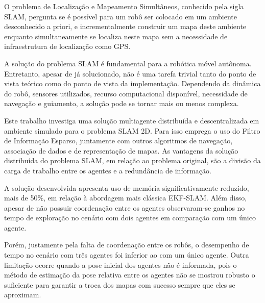 O problema de Localização e Mapeamento Simultâneos, conhecido pela sigla SLAM, pergunta se é possível para um robô ser colocado em um ambiente 
desconhecido a priori, e incrementalmente construir um mapa deste 
ambiente enquanto simultaneamente se localiza neste mapa sem a 
necessidade de infraestrutura de localização como GPS.

A solução do problema SLAM é fundamental para a robótica móvel 
autônoma. Entretanto, apesar de já solucionado, não é uma tarefa trivial 
tanto do ponto de vista teórico como do ponto de vista da implementação. 
Dependendo da dinâmica do robô, sensores utilizados, recurso 
computacional disponível, necessidade de navegação e guiamento, a solução 
pode se tornar mais ou menos complexa.

Este trabalho investiga uma solução multiagente distribuída e descentralizada em ambiente simulado 
para o problema SLAM 2D. Para isso emprega o uso do Filtro de Informação 
Esparso, juntamente com outros algoritmos de navegação, associação de 
dados e de representação de mapas. As vantagens da solução distribuída do 
problema SLAM, em relação ao problema original, são a divisão da carga 
de trabalho entre os agentes e a redundância de informação.

A solução desenvolvida apresenta uso de memória significativamente 
reduzido, mais de 50\%, em relação à abordagem mais clássica EKF-SLAM. 
Além disso, apesar de não possuir coordenação entre os agentes 
observaram-se ganhos no tempo de exploração no cenário com dois agentes 
em comparação com um único agente.

Porém, justamente pela falta de 
coordenação entre os robôs, o desempenho de tempo no cenário com 
três agentes foi inferior ao com um único agente. Outra limitação ocorre 
quando a pose inicial dos agentes não é informada, pois o método de 
estimação da pose relativa entre os agentes não se mostrou robusto o 
suficiente para garantir a troca dos mapas com sucesso sempre que eles se 
aproximam.